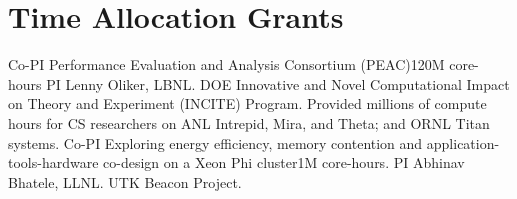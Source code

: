 \section{Time Allocation Grants}
		{Co-PI}
		{Performance Evaluation and Analysis Consortium (PEAC)}{}{120M core-hours}
		{PI Lenny Oliker, LBNL.  DOE
		 Innovative and Novel Computational Impact on Theory and Experiment (INCITE)
		 Program.  Provided millions of compute hours for CS researchers on
                 ANL Intrepid, Mira, and Theta; and ORNL Titan systems.}
	{Co-PI}
	{Exploring energy efficiency, memory contention and application-tools-hardware
		co-design on a Xeon Phi cluster}{}{1M core-hours.
	PI Abhinav Bhatele, LLNL.  UTK Beacon Project.}{}
